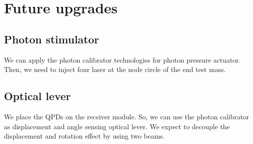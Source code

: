 
\chapter{Future upgrades} %

\label{Chapter7} %

\section{Photon stimulator}
We can apply the photon calibrator technologies for photon pressure actuator.
Then, we need to inject four laser at the node circle of the end test mass.

\section{Optical lever}
We place the QPDs on the receiver module. So, we can use the photon calibrator as displacement and angle sensing optical lever.
We expect to decouple the displacement and rotation effect by using two beams.
